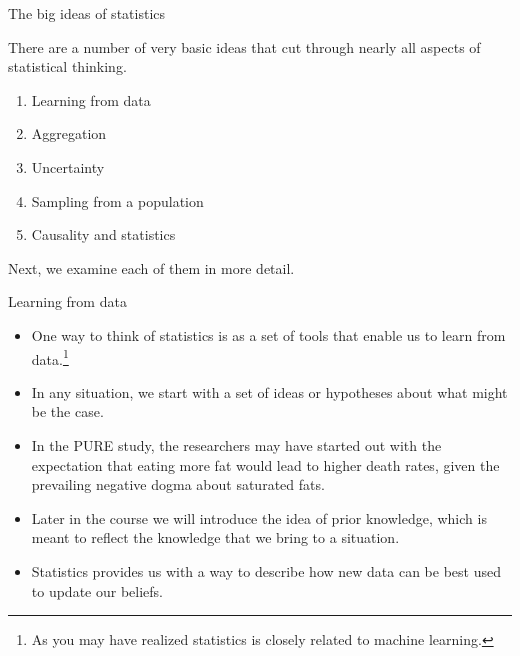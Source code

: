 \documentclass[handout]{beamer}
\begin{document}
\begin{frame}{The big ideas of statistics}

\scriptsize{
There are a number of very basic ideas that cut through nearly all aspects of statistical thinking. 

\begin{enumerate}
 \item Learning from data
 \item Aggregation
 \item Uncertainty
 \item Sampling from a population
 \item Causality and statistics
\end{enumerate}

Next, we examine each of them in more detail.

}
 
\end{frame}


\begin{frame}{Learning from data}

\scriptsize{
\begin{itemize}
\item One way to think of statistics is as a set of tools that enable us to learn from data.\footnote{As you may have realized statistics is closely related to machine learning.}
\item In any situation, we start with a set of ideas or hypotheses about what might be the case. 
\item In the PURE study, the researchers may have started out with the expectation that eating more fat would lead to higher death rates, given the prevailing negative dogma about saturated fats. 
\item Later in the course we will introduce the idea of prior knowledge, which is meant to reflect the knowledge that we bring to a situation. 

\item Statistics provides us with a way to describe how new data can be best used to update our beliefs.
\end{itemize}

}
 
\end{frame}
\end{document}
